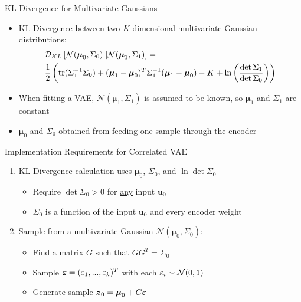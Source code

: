 \documentclass{beamer}
\def \e{\ensuremath \varepsilon}
\def \tr{\ensuremath \text{tr}}
\newcommand{\vect}[1]{\boldsymbol{#1}}
\theoremstyle{definition}
\begin{document}
\begin{frame}{KL-Divergence for Multivariate Gaussians}
\begin{itemize}
  \item KL-Divergence between two $K$-dimensional multivariate Gaussian distributions:
\begin{align*}
&\mathcal{D}_{KL}\left[\mathcal{N}(\vect\mu_0, \Sigma_0) || \mathcal{N}(\vect\mu_1, \Sigma_1)\right] = \\
&\frac{1}{2} \left(\tr(\Sigma_1^{-1} \Sigma_0) + (\vect\mu_1 - \vect\mu_0)^T \Sigma_1^{-1} (\vect\mu_1 - \vect\mu_0) - K + \ln\left(\frac{\det \Sigma_1}{\det \Sigma_0} \right) \right)
\end{align*}
  \item<2-> When fitting a VAE, $\mathcal{N}(\vect\mu_1, \Sigma_1)$ is assumed to be known, so $\vect\mu_1$ and $\Sigma_1$ are constant
  \item<2-> $\vect\mu_0$ and $\Sigma_0$ obtained from feeding one sample through the encoder
\end{itemize}
\end{frame}


\begin{frame}{Implementation Requirements for Correlated VAE}
\begin{enumerate}
  \item KL Divergence calculation uses $\vect\mu_0$, $\Sigma_0$, and $\ln\det \Sigma_0$ 
    \begin{itemize}
      \item<2-> Require $\det \Sigma_0 > 0$ for \underline{any} input $\vect u_0$
      \item<2-> $\Sigma_0$ is a function of the input $\vect u_0$ and every encoder weight 
    \end{itemize}
  \item Sample from a multivariate Gaussian $\mathcal{N}(\vect\mu_0, \Sigma_0)$:
  \begin{itemize}
    \item<3-> Find a matrix $G$ such that $G G^T = \Sigma_0$
    \item<3-> Sample $\vect\e = (\e_1,...,\e_k)^T$ with each $\e_i \sim \mathcal{N}(0,1)$
    \item<3-> Generate sample $\vect z_0 = \vect\mu_0 + G\vect\e$
  \end{itemize}
\end{enumerate}
\end{frame}
\end{document}
